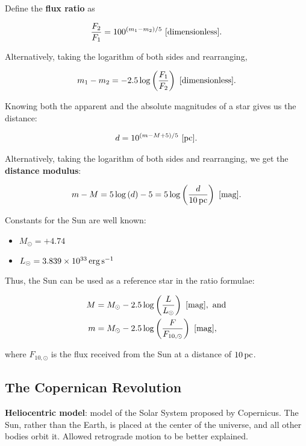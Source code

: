 \documentclass[a4paper,10pt]{article}
\begin{document}
Define the \textbf{flux ratio} as 

\begin{align*}
    \frac{F_2}{F_1} = 100^{(m_1-m_2)/5}~[{\rm dimensionless}].
\end{align*}

Alternatively, taking the logarithm of both sides and rearranging, 

\begin{align*}
    m_1 - m_2 = -2.5\log\left(\frac{F_1}{F_2}\right)~[{\rm dimensionless}].
\end{align*}

Knowing both the apparent and the absolute magnitudes of a star gives us the distance:

\begin{align*}
    d = 10^{(m-M+5)/5}~[{\rm pc}].
\end{align*}

Alternatively, taking the logarithm of both sides and rearranging, we get the \textbf{distance modulus}: 

\begin{align*}
    m-M = 5\log\left(d\right)-5 = 5\log\left({\frac{d}{10\,{\rm pc}}}\right)~[{\rm mag}].
\end{align*}

Constants for the Sun are well known:
\begin{itemize}
    \item $M_\odot = +4.74$
    \item $L_\odot= 3.839\times 10^{33}\,{\rm erg\,s^{-1}}$
\end{itemize}

Thus, the Sun can be used as a reference star in the ratio formulae: 

\begin{align*}
    M &= M_\odot - 2.5\log\left(\frac{L}{L_\odot}\right)~[{\rm mag}],~{\rm and }\\
    m &= M_\odot - 2.5\log\left(\frac{F}{F_{10, \odot}}\right)~[{\rm mag}],
\end{align*}

where $F_{10, \odot}$ is the flux received from the Sun at a distance of $10\,{\rm pc}$.

\subsection{The Copernican Revolution}

\textbf{Heliocentric model}: model of the Solar System proposed by Copernicus. The Sun, rather than the Earth, is placed at the center of the universe, and all other bodies orbit it. Allowed retrograde motion to be better explained. 
\end{document}
